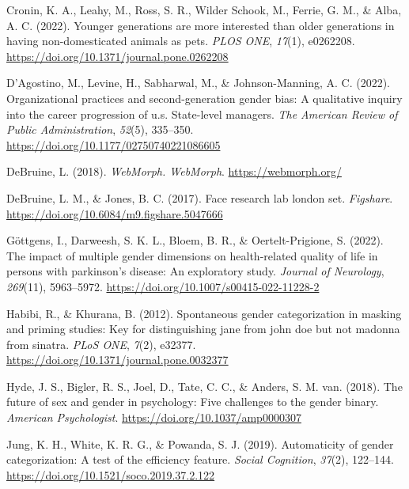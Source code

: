 \documentclass[
  man]{apa7}
\newlength{\cslhangindent}
\newlength{\cslentryspacingunit} %
\newenvironment{CSLReferences}[2] %
 {%
  \setlength{\parindent}{0pt}
  \ifodd #1
  \let\oldpar\par
  \def\par{\hangindent=\cslhangindent\oldpar}
  \fi
  \setlength{\parskip}{#2\cslentryspacingunit}
 }%
 {}
\begin{document}
\begin{CSLReferences}{1}{0}
\leavevmode{}%
Cronin, K. A., Leahy, M., Ross, S. R., Wilder Schook, M., Ferrie, G. M., \& Alba, A. C. (2022). Younger generations are more interested than older generations in having non-domesticated animals as pets. \emph{{PLOS} {ONE}}, \emph{17}(1), e0262208. \url{https://doi.org/10.1371/journal.pone.0262208}

\leavevmode{}%
D'Agostino, M., Levine, H., Sabharwal, M., \& Johnson-Manning, A. C. (2022). Organizational practices and second-generation gender bias: A qualitative inquiry into the career progression of u.s. State-level managers. \emph{The American Review of Public Administration}, \emph{52}(5), 335--350. \url{https://doi.org/10.1177/02750740221086605}

\leavevmode{}%
DeBruine, L. (2018). \emph{{WebMorph}. {WebMorph}}. \url{https://webmorph.org/}

\leavevmode{}%
DeBruine, L. M., \& Jones, B. C. (2017). Face research lab london set. \emph{Figshare}. \url{https://doi.org/10.6084/m9.figshare.5047666}

\leavevmode{}%
Göttgens, I., Darweesh, S. K. L., Bloem, B. R., \& Oertelt-Prigione, S. (2022). The impact of multiple gender dimensions on health-related quality of life in persons with parkinson's disease: An exploratory study. \emph{Journal of Neurology}, \emph{269}(11), 5963--5972. \url{https://doi.org/10.1007/s00415-022-11228-2}

\leavevmode{}%
Habibi, R., \& Khurana, B. (2012). Spontaneous gender categorization in masking and priming studies: Key for distinguishing jane from john doe but not madonna from sinatra. \emph{{PLoS} {ONE}}, \emph{7}(2), e32377. \url{https://doi.org/10.1371/journal.pone.0032377}

\leavevmode{}%
Hyde, J. S., Bigler, R. S., Joel, D., Tate, C. C., \& Anders, S. M. van. (2018). The future of sex and gender in psychology: Five challenges to the gender binary. \emph{American Psychologist}. \url{https://doi.org/10.1037/amp0000307}

\leavevmode{}%
Jung, K. H., White, K. R. G., \& Powanda, S. J. (2019). Automaticity of gender categorization: A test of the efficiency feature. \emph{Social Cognition}, \emph{37}(2), 122--144. \url{https://doi.org/10.1521/soco.2019.37.2.122}


\end{CSLReferences}
\end{document}
